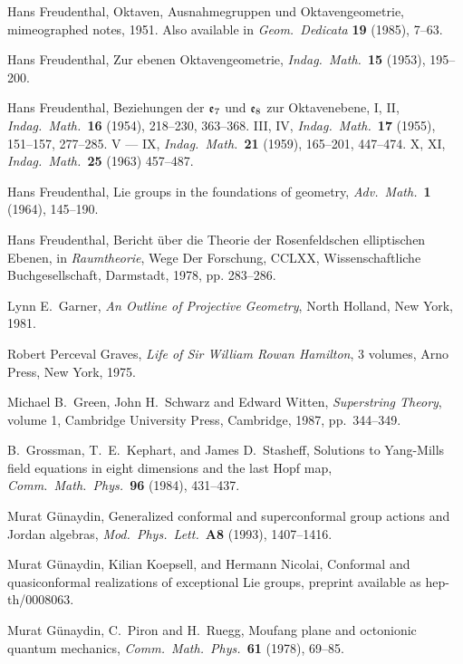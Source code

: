 \begin{thebibliography}{10}
  Hans Freudenthal, Oktaven, Ausnahmegruppen und    
Oktavengeometrie, mimeographed notes, 1951.  Also available in
{\sl Geom.\ Dedicata} {\bf 19} (1985), 7--63.    
   
 Hans Freudenthal, Zur ebenen Oktavengeometrie,    
{\sl Indag.\ Math.\ }{\bf 15} (1953), 195--200.   
   
 Hans Freudenthal, Beziehungen der ${\mathfrak {e}}_7$ und   
${\mathfrak {e}}_8$ zur Oktavenebene, I, II, {\sl Indag.\ Math.\ }{\bf 16} (1954),   
218--230, 363--368.  III, IV, {\sl Indag.\ Math.\ }{\bf 17} (1955),   
151--157, 277--285.  V --- IX, {\sl Indag.\ Math.\ }{\bf 21} (1959),  
165--201, 447--474.  X, XI, {\sl Indag.\ Math.\ }{\bf 25} (1963) 457--487. 
   
 Hans Freudenthal, Lie groups in the foundations of   
geometry, {\sl Adv.\ Math.\ }{\bf 1} (1964), 145--190.   

 Hans Freudenthal, Bericht \"uber die Theorie   
der Rosenfeldschen elliptischen Ebenen, in {\sl Raumtheorie}, Wege  
Der Forschung, CCLXX, Wissenschaftliche Buchgesellschaft, Darmstadt,  
1978, pp. 283--286.  

 Lynn E.\ Garner, {\sl An Outline of Projective Geometry}, 
North Holland, New York, 1981. 
   
 Robert Perceval Graves, {\sl Life of Sir William Rowan   
Hamilton}, 3 volumes, Arno Press, New York, 1975.   
   
 Michael B.\ Green, John H.\ Schwarz and Edward Witten,   
{\sl Superstring Theory}, volume 1, Cambridge University Press,    
Cambridge, 1987, pp.\ 344--349.   
 
 B.\ Grossman, T.\ E.\ Kephart, and James D.\ Stasheff, 
Solutions to Yang-Mills field equations in eight dimensions and the  
last Hopf map, {\sl Comm.\ Math.\ Phys.\ }{\bf 96} (1984), 431--437. 

 Murat G\"unaydin, Generalized conformal and
superconformal group actions and Jordan algebras, 
{\sl Mod.\ Phys.\ Lett.\ }{\bf A8} (1993), 1407--1416.

 Murat G\"unaydin, Kilian Koepsell, and Hermann Nicolai, 
Conformal and quasiconformal realizations of exceptional Lie groups,
preprint available as hep-th/0008063.

 Murat G\"unaydin, C.\ Piron and H.\ Ruegg, Moufang plane
and octonionic quantum mechanics, {\sl Comm.\ Math.\ Phys.\ }{\bf 61}
(1978), 69--85.
  

\end{thebibliography}
